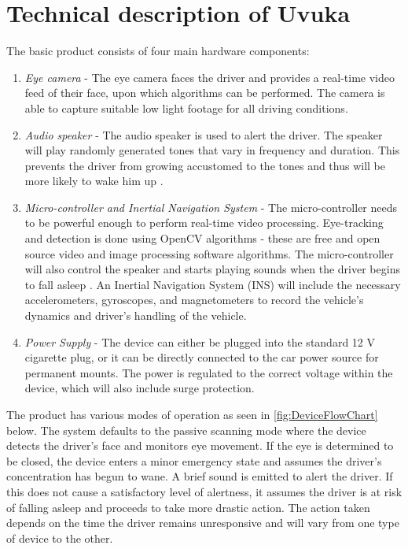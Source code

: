 \section{Technical description of Uvuka}
\label{sec:Technical description of Uvuka}
The basic product consists of four main hardware components:
\begin{enumerate}
  \item \textit{Eye camera} - The eye camera faces the driver and provides a real-time video feed of their face, upon which algorithms can be performed. The camera is able to capture suitable low light footage for all driving conditions.
  \item \textit{Audio speaker} - The audio speaker is used to alert the driver. The speaker will play randomly generated tones that vary in frequency and duration. This prevents the driver from growing accustomed to the tones and thus will be more likely to wake him up \cite{Habituation}.
  \item \textit{Micro-controller and Inertial Navigation System} - The micro-controller needs to be powerful enough to perform real-time video processing. Eye-tracking and detection is done using OpenCV algorithms - these are free and open source video and image processing software algorithms. The micro-controller will also control the speaker and starts playing sounds when the driver begins to fall asleep \cite{OpenCV}. An Inertial Navigation System (INS) will include the necessary accelerometers, gyroscopes, and magnetometers to record the vehicle's dynamics and driver's handling of the vehicle.
  \item \textit{Power Supply} - The device can either be plugged into the standard 12 V cigarette plug, or it can be directly connected to the car power source for permanent mounts. The power is regulated to the correct voltage within the device, which will also include surge protection.
\end{enumerate}

The product has various modes of operation as seen in \cref{fig:DeviceFlowChart} below. The system defaults to the passive scanning mode where the device detects the driver's face and monitors eye movement. If the eye is determined to be closed, the device  enters a minor emergency state and assumes the driver's concentration has begun to wane. A brief sound is emitted to alert the driver. If this does not cause a satisfactory level of alertness, it assumes the driver is at risk of falling asleep and proceeds to take more drastic action. The action taken depends on the time the driver remains unresponsive and will vary from one type of device to the other.

